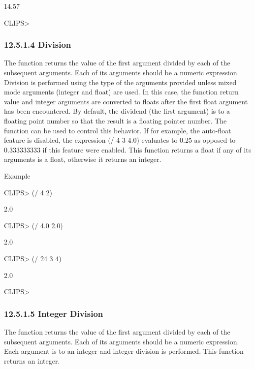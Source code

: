 \documentclass[letterpaper,10pt,english]{sphinxmanual}
\begin{document}
14.57

CLIPS\textgreater{}


\subsubsection{12.5.1.4 Division}
\label{\detokenize{actions:division}}
The \sphinxstylestrong{/} function returns the value of the first argument divided by
each of the subsequent arguments. Each of its arguments should be a
numeric expression. Division is performed using the type of the
arguments provided unless mixed mode arguments (integer and float) are
used. In this case, the function return value and integer arguments are
converted to floats after the first float argument has been encountered.
By default, the dividend (the first argument) is  to a floating point number so that the result is a floating
pointer number. The function  can be used to
control this behavior. If for example, the auto-float feature is
disabled, the expression (/ 4 3 4.0) evaluates to 0.25 as opposed to
0.333333333 if this feature were enabled. This function returns a float
if any of its arguments is a float, otherwise it returns an integer.


\begin{sphinxVerbatim}[commandchars=\\\{\}]
  
\end{sphinxVerbatim}

Example

CLIPS\textgreater{} (/ 4 2)

2.0

CLIPS\textgreater{} (/ 4.0 2.0)

2.0

CLIPS\textgreater{} (/ 24 3 4)

2.0

CLIPS\textgreater{}


\subsubsection{12.5.1.5 Integer Division}
\label{\detokenize{actions:integer-division}}
The  function returns the value of the first argument divided by
each of the subsequent arguments. Each of its arguments should be a
numeric expression. Each argument is  to an
integer and integer division is performed. This function returns an
integer.
\end{document}
